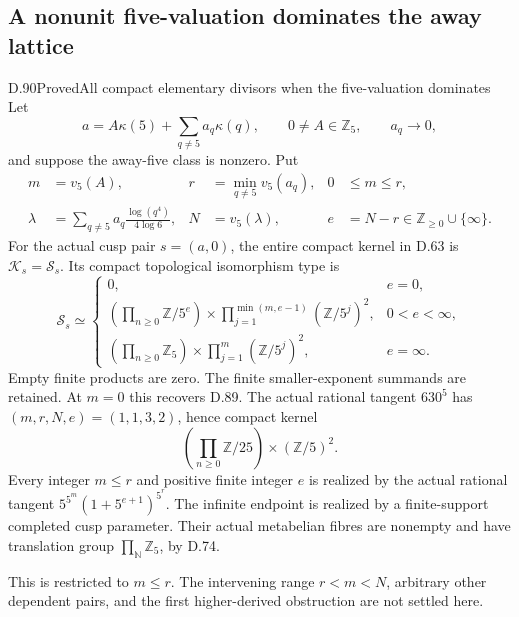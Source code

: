 \subsection{A nonunit five-valuation dominates the away lattice}

\begin{statement}{D.90}{Proved}{All compact elementary divisors when the five-valuation dominates}
Let
\[
 a=A\kappa(5)+\sum_{q\ne5}a_q\kappa(q),\qquad
 0\ne A\in\mathbb Z_5,\qquad a_q\longrightarrow0,
\]
and suppose the away-five class is nonzero. Put
\[
 \begin{aligned}
 m&=v_5(A),&r&=\min_{q\ne5}v_5(a_q),&0&\le m\le r,\\
 \lambda&=\sum_{q\ne5}a_q\frac{\log(q^4)}{4\log6},&
 N&=v_5(\lambda),&e&=N-r\in\mathbb Z_{\ge0}\cup\{\infty\}.
 \end{aligned}                                               \tag{D.90.1}
\]
For the actual cusp pair \(s=(a,0)\), the entire compact
kernel in D.63 is \(\mathcal K_s=\mathcal S_s\). Its compact
topological isomorphism type is
\[
 \mathcal S_s\simeq
 \begin{cases}
 0,&e=0,\\
 \displaystyle
 \left(\prod_{n\ge0}\mathbb Z/5^e\right)
 \times\prod_{j=1}^{\min(m,e-1)}(\mathbb Z/5^j)^2,
       &0<e<\infty,\\
 \displaystyle
 \left(\prod_{n\ge0}\mathbb Z_5\right)
 \times\prod_{j=1}^{m}(\mathbb Z/5^j)^2,
       &e=\infty.
 \end{cases}                                               \tag{D.90.2}
\]
Empty finite products are zero. The finite smaller-exponent
summands are retained. At \(m=0\) this recovers D.89.
The actual rational tangent \(630^5\) has
\((m,r,N,e)=(1,1,3,2)\), hence compact kernel
\[
             \left(\prod_{n\ge0}\mathbb Z/25\right)
                         \times(\mathbb Z/5)^2.        \tag{D.90.3}
\]
Every integer \(m\le r\) and positive finite integer \(e\)
is realized by the actual rational tangent
\(5^{5^m}(1+5^{e+1})^{5^r}\). The infinite endpoint is
realized by a finite-support completed cusp parameter.
Their actual metabelian fibres are nonempty and have
translation group \(\prod_{\mathbb N}\mathbb Z_5\), by D.74.

This is restricted to \(m\le r\). The intervening range
\(r<m<N\), arbitrary other dependent pairs, and the first
higher-derived obstruction are not settled here.
\end{statement}

